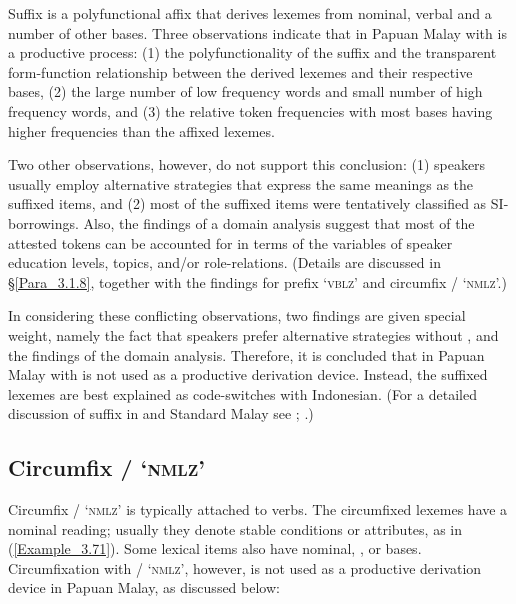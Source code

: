 Suffix  is a polyfunctional affix that derives lexemes from nominal, verbal and a number of other bases. Three observations indicate that in Papuan Malay  with  is a productive process: (1) the polyfunctionality of the suffix and the transparent form-function relationship between the derived lexemes and their respective bases, (2) the large number of low frequency words and small number of high frequency words, and (3) the relative token frequencies with most bases having higher frequencies than the affixed lexemes.



Two other observations, however, do not support this conclusion: (1) speakers usually employ alternative strategies that express the same meanings as the suffixed items, and (2) most of the suffixed items were tentatively classified as SI-borrowings. Also, the findings of a domain analysis suggest that most of the attested tokens can be accounted for in terms of the variables of speaker education levels, topics, and/or role-relations. (Details are discussed in §\ref{Para_3.1.8}, together with the findings for prefix  ‘\textsc{vblz}’ and circumfix \textitbf{-}/\textitbf{-} ‘\textsc{nmlz}’.)



In considering these conflicting observations, two findings are given special weight, namely the fact that speakers prefer alternative strategies without , and the findings of the domain analysis. Therefore, it is concluded that in Papuan Malay  with  is not used as a productive derivation device. Instead, the suffixed lexemes are best explained as code-switches with Indonesian. (For a detailed discussion of suffix  in  and Standard Malay see \citealt{Mintz.1994}; \citealt{Sneddon.2010}.)


\subsection{Circumfix \textitbf{-}/\textitbf{-} ‘\textsc{nmlz}’}\label{Para_3.1.7}

Circumfix \textitbf{-}/\textitbf{-} ‘\textsc{nmlz}’ is typically attached to verbs. The circumfixed lexemes have a nominal reading; usually they denote stable conditions or attributes, as in (\ref{Example_3.71}). Some lexical items also have nominal, , or  bases. Circumfixation with \textitbf{-}/\textitbf{-} ‘\textsc{nmlz}’, however, is not used as a productive derivation device in Papuan Malay, as discussed below:

